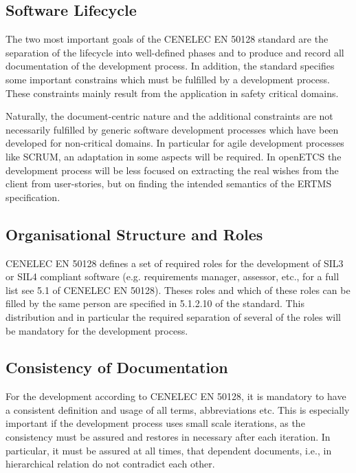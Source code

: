 
\subsection{Software Lifecycle}
\label{sec:software-lifecycle}

The two most important goals of the CENELEC EN 50128 standard are the separation
of the lifecycle into well-defined phases and to produce and record all
documentation of the development process. In addition, the standard specifies
some important constrains which must be fulfilled by a development
process. These constraints mainly result from the application in safety critical
domains.

Naturally, the document-centric nature and the additional constraints are not
necessarily fulfilled by generic software development processes which have been
developed for non-critical domains. In particular for agile development
processes like SCRUM, an adaptation in some aspects will be
required. In openETCS the development process will be less  focused on
extracting the real wishes from the client from user-stories, but on finding the
intended semantics of the ERTMS specification.

\subsection{Organisational Structure and Roles}
\label{sec:organ-struct-roles}

CENELEC EN 50128 defines a set of required roles for the development of SIL3 or
SIL4 compliant software (e.g. requirements manager, assessor, etc., for a full
list see 5.1 of CENELEC EN 50128). Theses roles and which of these roles can be
filled by the same person are specified in 5.1.2.10 of the standard. This
distribution and in particular the required separation of several of the roles
will be mandatory for the development process.

\subsection{Consistency of Documentation}
\label{sec:cons-docum}

For the development according to CENELEC EN 50128, it is mandatory to have a
consistent definition and usage of all terms, abbreviations etc. This is
especially important if the development process uses small scale iterations, as
the consistency must be assured and restores in necessary after each
iteration. In particular, it must be assured at all times, that dependent
documents, i.e., in hierarchical relation do not contradict each other.

